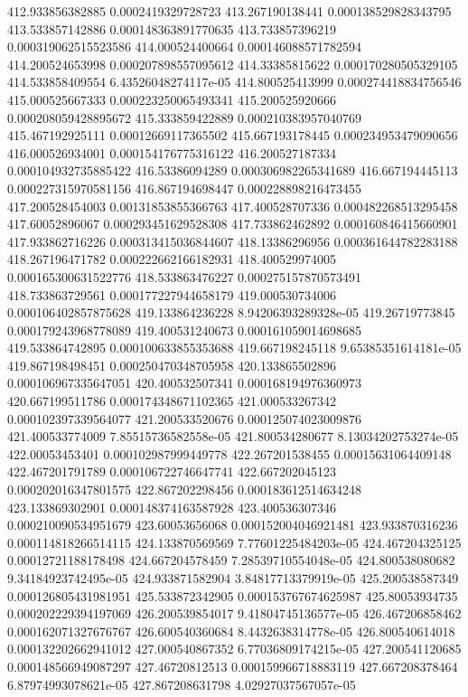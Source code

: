 {412.933856382885 0.0002419329728723
413.267190138441 0.000138529828343795
413.533857142886 0.000148363891770635
413.733857396219 0.000319062515523586
414.000524400664 0.000146088571782594
414.200524653998 0.000207898557095612
414.33385815622 0.000170280505329105
414.533858409554 6.43526048274117e-05
414.800525413999 0.000274418834756546
415.000525667333 0.000223250065493341
415.200525920666 0.000208059428895672
415.333859422889 0.000210383957040769
415.467192925111 0.00012669117365502
415.667193178445 0.000234953479090656
416.000526934001 0.000154176775316122
416.200527187334 0.000104932735885422
416.53386094289 0.000306982265341689
416.667194445113 0.000227315970581156
416.867194698447 0.000228898216473455
417.200528454003 0.00131853855366763
417.400528707336 0.000482268513295458
417.60052896067 0.000293451629528308
417.733862462892 0.000160846415660901
417.933862716226 0.000313415036844607
418.13386296956 0.000361644782283188
418.267196471782 0.000222662166182931
418.400529974005 0.000165300631522776
418.533863476227 0.000275157870573491
418.733863729561 0.000177227944658179
419.000530734006 0.000106402857875628
419.133864236228 8.94206393289328e-05
419.26719773845 0.000179243968778089
419.400531240673 0.000161059014698685
419.533864742895 0.000100633855353688
419.667198245118 9.65385351614181e-05
419.867198498451 0.000250470348705958
420.133865502896 0.000106967335647051
420.400532507341 0.000168194976360973
420.667199511786 0.000174348671102365
421.000533267342 0.000102397339564077
421.200533520676 0.000125074023009876
421.400533774009 7.85515736582558e-05
421.800534280677 8.13034202753274e-05
422.00053453401 0.000102987999449778
422.267201538455 0.00015631064409148
422.467201791789 0.000106722746647741
422.667202045123 0.000202016347801575
422.867202298456 0.000183612514634248
423.133869302901 0.000148374163587928
423.400536307346 0.000210090534951679
423.60053656068 0.000152004046921481
423.933870316236 0.000114818266514115
424.133870569569 7.77601225484203e-05
424.467204325125 0.00012721188178498
424.667204578459 7.28539710554048e-05
424.800538080682 9.34184923742495e-05
424.933871582904 3.84817713379919e-05
425.200538587349 0.000126805431981951
425.533872342905 0.000153767674625987
425.80053934735 0.000202229394197069
426.200539854017 9.41804745136577e-05
426.467206858462 0.000162071327676767
426.600540360684 8.4432638314778e-05
426.800540614018 0.000132202662941012
427.000540867352 6.77036809174215e-05
427.200541120685 0.000148566949087297
427.46720812513 0.000159966718883119
427.667208378464 6.87974993078621e-05
427.867208631798 4.02927037567057e-05
}
